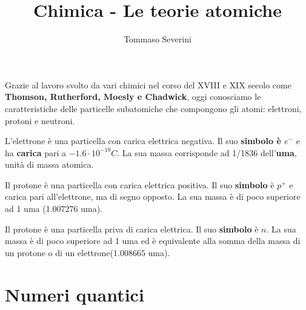 \documentclass[10pt,a4paper]{article}
\author{Tommaso Severini}
\title{Chimica - Le teorie atomiche}
\begin{document}
	
	
	
	\maketitle
	
	Grazie al lavoro svolto da vari chimici nel corso del XVIII e XIX secolo come \textbf{Thomson, Rutherford, Moesly e Chadwick}, oggi conosciamo le caratteristiche delle particelle subatomiche che compongono gli atomi: elettroni, protoni e neutroni.
	
	\begin{definitionblue}[L'elettrone]
		L'elettrone è una particella con carica elettrica negativa. Il suo \textbf{simbolo è $e^-$} e ha \textbf{carica} pari a $-1.6 \cdot 10^{-19} C$. La sua massa corrisponde ad 1/1836 dell'\textbf{uma}, unità di massa atomica.
	\end{definitionblue}

	\begin{definitionred}[Il protone]
		Il protone è una particella con carica elettrica positiva. Il suo \textbf{simbolo} è $p^+$ e carica pari all'elettrone, ma di segno opposto. La sua massa è di poco superiore ad 1 uma (1.007276 uma).
	\end{definitionred}

	\begin{definitiongreen}[Il neutrone]
		Il protone è una particella priva di carica elettrica. Il suo \textbf{simbolo} è $n$. La sua massa è di poco superiore ad 1 uma ed è equivalente alla somma della massa di un protone o di un elettrone(1.008665 uma).
	\end{definitiongreen}

\section{Numeri quantici}
\end{document}
